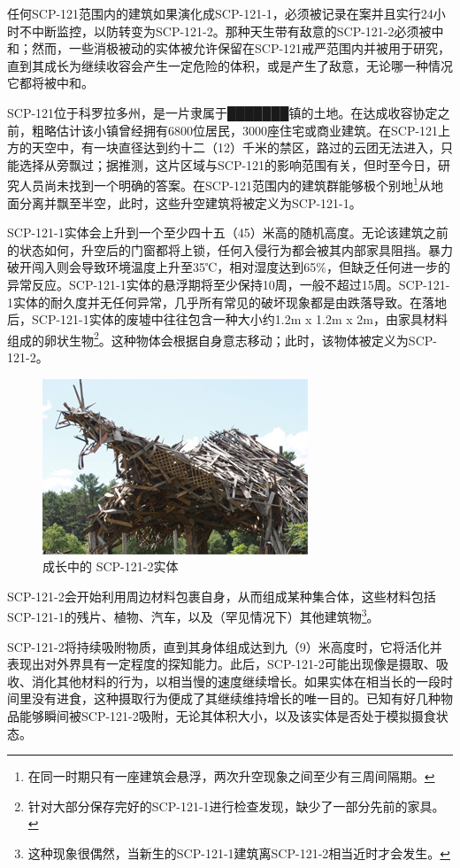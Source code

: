 任何SCP-121范围内的建筑如果演化成SCP-121-1，必须被记录在案并且实行24小时不中断监控，以防转变为SCP-121-2。那种天生带有敌意的SCP-121-2必须被中和；然而，一些消极被动的实体被允许保留在SCP-121戒严范围内并被用于研究，直到其成长为继续收容会产生一定危险的体积，或是产生了敌意，无论哪一种情况它都将被中和。

SCP-121位于科罗拉多州，是一片隶属于███████镇的土地。在达成收容协定之前，粗略估计该小镇曾经拥有6800位居民，3000座住宅或商业建筑。在SCP-121上方的天空中，有一块直径达到约十二（12）千米的禁区，路过的云团无法进入，只能选择从旁飘过；据推测，这片区域与SCP-121的影响范围有关，但时至今日，研究人员尚未找到一个明确的答案。在SCP-121范围内的建筑群能够极个别地\footnote{在同一时期只有一座建筑会悬浮，两次升空现象之间至少有三周间隔期。}从地面分离并飘至半空，此时，这些升空建筑将被定义为SCP-121-1。

SCP-121-1实体会上升到一个至少四十五（45）米高的随机高度。无论该建筑之前的状态如何，升空后的门窗都将上锁，任何入侵行为都会被其内部家具阻挡。暴力破开闯入则会导致环境温度上升至35℃，相对湿度达到65\%，但缺乏任何进一步的异常反应。SCP-121-1实体的悬浮期将至少保持10周，一般不超过15周。SCP-121-1实体的耐久度并无任何异常，几乎所有常见的破坏现象都是由跌落导致。在落地后，SCP-121-1实体的废墟中往往包含一种大小约1.2m x 1.2m x 2m，由家具材料组成的卵状生物\footnote{针对大部分保存完好的SCP-121-1进行检查发现，缺少了一部分先前的家具。}。这种物体会根据自身意志移动；此时，该物体被定义为SCP-121-2。

\begin{figure}[H]
    \centering
    \includegraphics[width=0.5\linewidth]{images/SCP-121-2.png}
    \caption*{成长中的 SCP-121-2实体}
\end{figure}

SCP-121-2会开始利用周边材料包裹自身，从而组成某种集合体，这些材料包括SCP-121-1的残片、植物、汽车，以及（罕见情况下）其他建筑物\footnote{这种现象很偶然，当新生的SCP-121-1建筑离SCP-121-2相当近时才会发生。}。

SCP-121-2将持续吸附物质，直到其身体组成达到九（9）米高度时，它将活化并表现出对外界具有一定程度的探知能力。此后，SCP-121-2可能出现像是摄取、吸收、消化其他材料的行为，以相当慢的速度继续增长。如果实体在相当长的一段时间里没有进食，这种摄取行为便成了其继续维持增长的唯一目的。已知有好几种物品能够瞬间被SCP-121-2吸附，无论其体积大小，以及该实体是否处于模拟摄食状态。

